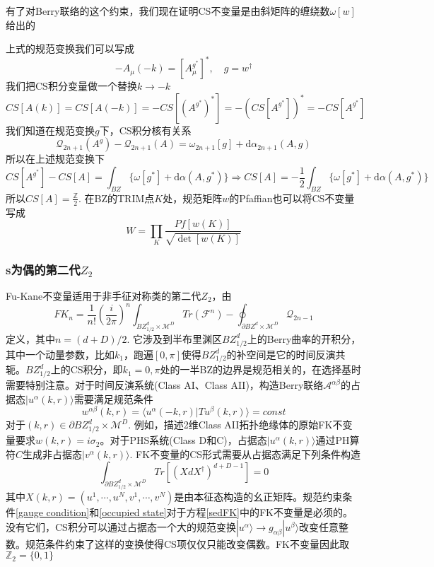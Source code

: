 \documentclass[a4paper]{article}
\numberwithin{equation}{subsection}
\begin{document}
有了对Berry联络的这个约束，我们现在证明CS不变量是由斜矩阵的缠绕数$\omega[w]$给出的

上式的规范变换我们可以写成
\begin{equation}
    -A_\mu(-k)=[A_\mu^{g^*}]^*,\quad g=w^\dagger
\end{equation}
我们把CS积分变量做一个替换$k\rightarrow -k$
\begin{equation}
    CS[A(k)]=CS[A(-k)]=-CS[(A^{g^*})^*]=-(CS[A^{g^*}])^*=-CS[A^{g^*}]
\end{equation}
我们知道在规范变换$g$下，CS积分核有关系
\begin{equation}
    \mathcal{Q}_{2n+1}(A^g)-\mathcal{Q}_{2n+1}(A)=\omega_{2n+1}[g]+\mathrm{d}\alpha_{2n+1}(A,g)
\end{equation}
所以在上述规范变换下
\begin{equation}
    CS[A^{g^*}]-CS[A]=\int_{BZ}\{\omega[g^*]+\mathrm{d}\alpha(A,g^*)\}\Rightarrow CS[A]=-\frac{1}{2}\int_{BZ}\{\omega[g^*]+\mathrm{d}\alpha(A,g^*)\}
\end{equation}
所以$CS[A]=\frac{\mathbb{Z}}{2}$. 在BZ的TRIM点$K$处，规范矩阵$w$的Pfaffian也可以将CS不变量写成
\begin{equation}
    W=\prod_{K}\frac{Pf[w(K)]}{\sqrt{\det[w(K)]}}
\end{equation}
\subsubsection{s为偶的第二代$Z_2$}
Fu-Kane不变量适用于非手征对称类的第二代$Z_2$，由
\begin{equation}\label{sedFK}
    FK_n=\frac{1}{n!}\left(\frac{i}{2\pi}\right)^n\int_{BZ_{1/2}^d\times\mathcal{M}^D}Tr(\mathcal{F}^n)-\oint_{\partial BZ^d\times\mathcal{M}^D}\mathcal{Q}_{2n-1}
\end{equation}
定义，其中$n=(d+D)/2$. 它涉及到半布里渊区$BZ^d_{1/2}$上的Berry曲率的开积分，其中一个动量参数，比如$k_1$，跑遍$[0,\pi]$使得$BZ_{1/2}^d$的补空间是它的时间反演共轭。$BZ_{1/2}^d$上的CS积分，即$k_1=0,\pi$处的一半BZ的边界是规范相关的，在选择基时需要特别注意。对于时间反演系统(Class AI、Class AII)，构造Berry联络$\mathcal{A}^{\alpha\beta}$的占据态$|u^\alpha(k,r)\rangle$需要满足规范条件
\begin{equation}\label{gauge condition}
    w^{\alpha\beta}(k,r)=\langle u^\alpha(-k,r)|Tu^\beta(k,r)\rangle=const
\end{equation}
对于$(k,r)\in\partial BZ_{1/2}^d\times \mathcal{M}^D$. 例如，描述2维Class AII拓扑绝缘体的原始FK不变量要求$w(k,r)=i\sigma_2$。对于PHS系统(Class D和C)，占据态$|u^\alpha(k,r)\rangle$通过PH算符$C$生成非占据态$|v^\alpha(k,r)\rangle$. FK不变量的CS形式需要从占据态满足下列条件构造
\begin{equation}\label{occupied state}
    \int_{\partial BZ_{1/2}^d\times\mathcal{M}^D}Tr[(XdX^\dagger)^{d+D-1}]=0
\end{equation}
其中$X(k,r)=(u^1,\cdots,u^N,v^1,\cdots,v^N)$是由本征态构造的幺正矩阵。规范约束条件\eqref{gauge condition}和\eqref{occupied state}对于方程\eqref{sedFK}中的FK不变量是必须的。没有它们，CS积分可以通过占据态一个大的规范变换$|u^\alpha\rangle\rightarrow g_{\alpha\beta}|u^\beta\rangle$改变任意整数。规范条件约束了这样的变换使得CS项仅仅只能改变偶数。FK不变量因此取$\mathbb{Z}_2=\{0,1\}$
\end{document}

